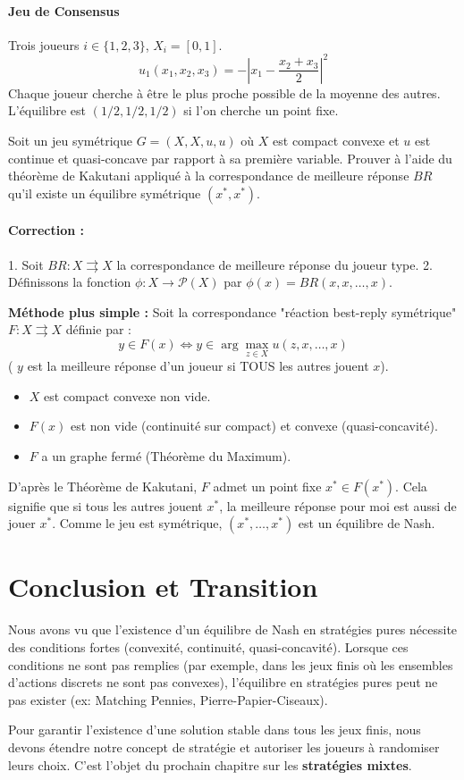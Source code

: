 \paragraph{Jeu de Consensus}
Trois joueurs $i \in \{1,2,3\}$, $X_i = [0,1]$.
\[ u_1(x_1, x_2, x_3) = - \left| x_1 - \frac{x_2 + x_3}{2} \right|^2 \]
Chaque joueur cherche à être le plus proche possible de la moyenne des autres.
L'équilibre est $(1/2, 1/2, 1/2)$ si l'on cherche un point fixe.

\begin{exercice}
Soit un jeu symétrique $G = (X, X, u, u)$ où $X$ est compact convexe et $u$ est continue et quasi-concave par rapport à sa première variable. Prouver à l'aide du théorème de Kakutani appliqué à la correspondance de meilleure réponse $BR$ qu'il existe un équilibre symétrique $(x^*, x^*)$.
\paragraph{Correction :}
1. Soit $BR : X \rightrightarrows X$ la correspondance de meilleure réponse du joueur type.
2. Définissons la fonction $\phi : X \to \mathcal{P}(X)$ par $\phi(x) = BR(x, x, \dots, x)$.
   
   \textbf{Méthode plus simple :}
   Soit la correspondance "réaction best-reply symétrique" $F: X \rightrightarrows X$ définie par :
   $$ y \in F(x) \iff y \in \arg\max_{z \in X} u(z, x, \dots, x) $$
   ( $y$ est la meilleure réponse d'un joueur si TOUS les autres jouent $x$).
   
   \begin{itemize}
       \item $X$ est compact convexe non vide.
       \item $F(x)$ est non vide (continuité sur compact) et convexe (quasi-concavité).
       \item $F$ a un graphe fermé (Théorème du Maximum).
   \end{itemize}
   D'après le Théorème de Kakutani, $F$ admet un point fixe $x^* \in F(x^*)$.
   Cela signifie que si tous les autres jouent $x^*$, la meilleure réponse pour moi est aussi de jouer $x^*$.
   Comme le jeu est symétrique, $(x^*, \dots, x^*)$ est un équilibre de Nash.
\end{exercice}

\section{Conclusion et Transition}
Nous avons vu que l'existence d'un équilibre de Nash en stratégies pures nécessite des conditions fortes (convexité, continuité, quasi-concavité). Lorsque ces conditions ne sont pas remplies (par exemple, dans les jeux finis où les ensembles d'actions discrets ne sont pas convexes), l'équilibre en stratégies pures peut ne pas exister (ex: Matching Pennies, Pierre-Papier-Ciseaux).

Pour garantir l'existence d'une solution stable dans tous les jeux finis, nous devons étendre notre concept de stratégie et autoriser les joueurs à randomiser leurs choix. C'est l'objet du prochain chapitre sur les \textbf{stratégies mixtes}.
